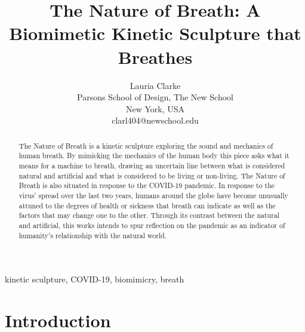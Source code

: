 \documentclass[letterpaper]{article}
\title{The Nature of Breath: A Biomimetic Kinetic Sculpture that Breathes}
\author{Lauria Clarke\\ Parsons School of Design, The New School\\ New York, USA\\ clarl404@newschool.edu\\
\newline
\newline
}
\begin{document}
 
\maketitle

\begin{abstract}
The Nature of Breath is a kinetic sculpture exploring the sound and mechanics of human breath. By mimicking the mechanics of the human body this piece asks what it means for a machine to breath, drawing an uncertain line between what is considered natural and artificial and what is considered to be living or non-living. The Nature of Breath is also situated in response to the COVID-19 pandemic. In response to the virus' spread over the last two years, humans around the globe have become unusually attuned to the degrees of health or sickness that breath can indicate as well as the factors that may change one to the other. Through its contrast between the natural and artificial, this works intends to spur reflection on the pandemic as an indicator of humanity's relationship with the natural world. 
\end{abstract}

kinetic sculpture, COVID-19, biomimicry, breath
\section{Introduction}
\end{document}
